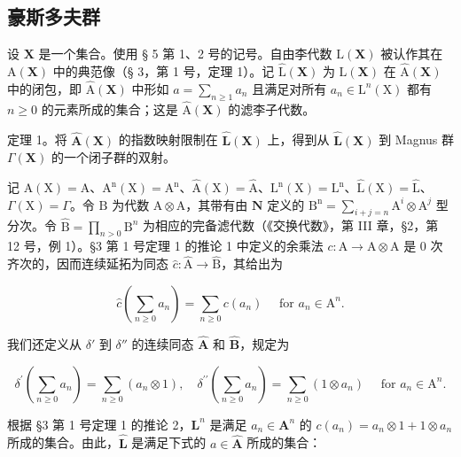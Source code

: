 \subsection{豪斯多夫群}

设 \(\mathbf{X}\) 是一个集合。使用 § 5 第 1、2 号的记号。自由李代数 \(\mathrm{L}(\mathbf{X})\) 被认作其在 \(\mathrm{A}(\mathbf{X})\) 中的典范像（§ 3，第 1 号，定理 1）。记 \(\hat{\mathrm{L}}(\mathbf{X})\) 为 \(\mathrm{L}(\mathbf{X})\) 在 \(\hat{\mathrm{A}}(\mathbf{X})\) 中的闭包，即 \(\hat{\mathrm{A}}(\mathbf{X})\) 中形如 \(a = \sum_{n\geqslant 1}a_n\) 且满足对所有 \(a_{n}\in \mathrm{L}^{n}(\mathrm{X})\) 都有 \(n\geqslant 0\) 的元素所成的集合；这是 \(\hat{\mathrm{A}}(\mathbf{X})\) 的滤李子代数。

定理 1。将 \(\hat{\mathbf{A}}(\mathbf{X})\) 的指数映射限制在 \(\hat{\mathbf{L}}(\mathbf{X})\) 上，得到从 \(\hat{\mathbf{L}}(\mathbf{X})\) 到 Magnus 群 \(\Gamma(\mathbf{X})\) 的一个闭子群的双射。

记 \(\mathrm{A}(\mathrm{X}) = \mathrm{A}\)、\(\mathrm{A}^{\mathrm{n}}(\mathrm{X}) = \mathrm{A}^{\mathrm{n}}\)、\(\hat{\mathrm{A}}(\mathrm{X}) = \hat{\mathrm{A}}\)、\(\mathrm{L}^{\mathrm{n}}(\mathrm{X}) = \mathrm{L}^{\mathrm{n}}\)、\(\hat{\mathrm{L}}(\mathrm{X}) = \hat{\mathrm{L}}\)、\(\Gamma(\mathrm{X}) = \Gamma\)。令 \(\mathrm{B}\) 为代数 \(\mathrm{A} \otimes \mathrm{A}\)，其带有由 \(\mathbf{N}\) 定义的 \(\mathrm{B}^{\mathrm{n}} = \sum_{i+j=n} \mathrm{A}^{i} \otimes \mathrm{A}^{j}\) 型分次。令 \(\hat{\mathrm{B}} = \prod_{n > 0} \mathrm{B}^{n}\) 为相应的完备滤代数（《交换代数》，第 III 章，§2，第 12 号，例 1）。§3 第 1 号定理 1 的推论 1 中定义的余乘法 \(c: \mathrm{A} \to \mathrm{A} \otimes \mathrm{A}\) 是 0 次齐次的，因而连续延拓为同态 \(\hat c: \hat{\mathrm{A}} \to \hat{\mathrm{B}}\)，其给出为

\[
\hat {c} \left(\sum_ {n \geqslant 0} a _ {n}\right) = \sum_ {n \geqslant 0} c (a _ {n}) \quad \text { for } a _ {n} \in \mathrm{A} ^ {n}.
\]

我们还定义从 \(\delta'\) 到 \(\delta''\) 的连续同态 \(\hat{\mathbf{A}}\) 和 \(\hat{\mathbf{B}}\)，规定为

\[
\delta^ {\prime} \left(\sum_ {n \geqslant 0} a _ {n}\right) = \sum_ {n \geqslant 0} (a _ {n} \otimes 1), \quad \delta^ {\prime \prime} \left(\sum_ {n \geqslant 0} a _ {n}\right) = \sum_ {n \geqslant 0} (1 \otimes a _ {n}) \quad \text { for } a _ {n} \in \mathrm{A} ^ {n}.
\]

根据 §3 第 1 号定理 1 的推论 2，\(\mathbf{L}^n\) 是满足 \(a_{n}\in \mathbf{A}^{n}\) 的 \(c(a_{n}) = a_{n}\otimes 1 + 1\otimes a_{n}\) 所成的集合。由此，\(\hat{\mathbf{L}}\) 是满足下式的 \(a\in \hat{\mathbf{A}}\) 所成的集合：

